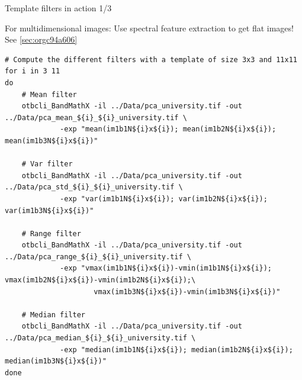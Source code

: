 \documentclass[10pt,aspectratio=1610]{beamer}
\begin{document}
\begin{frame}[fragile,label={sec:org091ccb9}]{Template filters in action 1/3}
 \begin{center}
\alert{For multidimensional images: Use spectral feature extraction to get flat images!} See \ref{sec:orgc94a606}
\end{center}

\begin{verbatim}
# Compute the different filters with a template of size 3x3 and 11x11
for i in 3 11
do
    # Mean filter
    otbcli_BandMathX -il ../Data/pca_university.tif -out ../Data/pca_mean_${i}_${i}_university.tif \
		     -exp "mean(im1b1N${i}x${i}); mean(im1b2N${i}x${i}); mean(im1b3N${i}x${i})"

    # Var filter
    otbcli_BandMathX -il ../Data/pca_university.tif -out ../Data/pca_std_${i}_${i}_university.tif \
		     -exp "var(im1b1N${i}x${i}); var(im1b2N${i}x${i}); var(im1b3N${i}x${i})"

    # Range filter
    otbcli_BandMathX -il ../Data/pca_university.tif -out ../Data/pca_range_${i}_${i}_university.tif \
		     -exp "vmax(im1b1N${i}x${i})-vmin(im1b1N${i}x${i}); vmax(im1b2N${i}x${i})-vmin(im1b2N${i}x${i});\
                     vmax(im1b3N${i}x${i})-vmin(im1b3N${i}x${i})"

    # Median filter
    otbcli_BandMathX -il ../Data/pca_university.tif -out ../Data/pca_median_${i}_${i}_university.tif \
		     -exp "median(im1b1N${i}x${i}); median(im1b2N${i}x${i}); median(im1b3N${i}x${i})"
done
\end{verbatim}
\end{frame}
\end{document}
